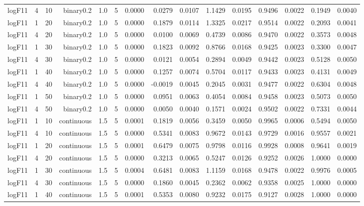 \begin{longtable}{rrrrrrrrrrrrrrr}
  logF11 & 4 & 10 & binary0.2 & 1.0 & 5 & 0.0000 & 0.0279 & 0.0107 & 1.1429 & 0.0195 & 0.9496 & 0.0022 & 0.1949 & 0.0040 \\ 
  logF11 & 1 & 20 & binary0.2 & 1.0 & 5 & 0.0000 & 0.1879 & 0.0114 & 1.3325 & 0.0217 & 0.9514 & 0.0022 & 0.2093 & 0.0041 \\ 
  logF11 & 4 & 20 & binary0.2 & 1.0 & 5 & 0.0000 & 0.0100 & 0.0069 & 0.4739 & 0.0086 & 0.9470 & 0.0022 & 0.3573 & 0.0048 \\ 
  logF11 & 1 & 30 & binary0.2 & 1.0 & 5 & 0.0000 & 0.1823 & 0.0092 & 0.8766 & 0.0168 & 0.9425 & 0.0023 & 0.3300 & 0.0047 \\ 
  logF11 & 4 & 30 & binary0.2 & 1.0 & 5 & 0.0000 & 0.0121 & 0.0054 & 0.2894 & 0.0049 & 0.9442 & 0.0023 & 0.5128 & 0.0050 \\ 
  logF11 & 1 & 40 & binary0.2 & 1.0 & 5 & 0.0000 & 0.1257 & 0.0074 & 0.5704 & 0.0117 & 0.9433 & 0.0023 & 0.4131 & 0.0049 \\ 
  logF11 & 4 & 40 & binary0.2 & 1.0 & 5 & 0.0000 & -0.0019 & 0.0045 & 0.2045 & 0.0031 & 0.9477 & 0.0022 & 0.6304 & 0.0048 \\ 
  logF11 & 1 & 50 & binary0.2 & 1.0 & 5 & 0.0000 & 0.0951 & 0.0063 & 0.4054 & 0.0084 & 0.9458 & 0.0023 & 0.5073 & 0.0050 \\ 
  logF11 & 4 & 50 & binary0.2 & 1.0 & 5 & 0.0000 & 0.0050 & 0.0040 & 0.1571 & 0.0024 & 0.9502 & 0.0022 & 0.7331 & 0.0044 \\ 
  logF11 & 1 & 10 & continuous & 1.5 & 5 & 0.0001 & 0.1819 & 0.0056 & 0.3459 & 0.0050 & 0.9965 & 0.0006 & 0.5494 & 0.0050 \\ 
  logF11 & 4 & 10 & continuous & 1.5 & 5 & 0.0000 & 0.5341 & 0.0083 & 0.9672 & 0.0143 & 0.9729 & 0.0016 & 0.9557 & 0.0021 \\ 
  logF11 & 1 & 20 & continuous & 1.5 & 5 & 0.0001 & 0.6479 & 0.0075 & 0.9798 & 0.0116 & 0.9928 & 0.0008 & 0.9641 & 0.0019 \\ 
  logF11 & 4 & 20 & continuous & 1.5 & 5 & 0.0000 & 0.3213 & 0.0065 & 0.5247 & 0.0126 & 0.9252 & 0.0026 & 1.0000 & 0.0000 \\ 
  logF11 & 1 & 30 & continuous & 1.5 & 5 & 0.0004 & 0.6481 & 0.0083 & 1.1159 & 0.0168 & 0.9478 & 0.0022 & 0.9976 & 0.0005 \\ 
  logF11 & 4 & 30 & continuous & 1.5 & 5 & 0.0000 & 0.1860 & 0.0045 & 0.2362 & 0.0062 & 0.9358 & 0.0025 & 1.0000 & 0.0000 \\ 
  logF11 & 1 & 40 & continuous & 1.5 & 5 & 0.0001 & 0.5353 & 0.0080 & 0.9232 & 0.0175 & 0.9127 & 0.0028 & 1.0000 & 0.0000 \\ 

\end{longtable}
